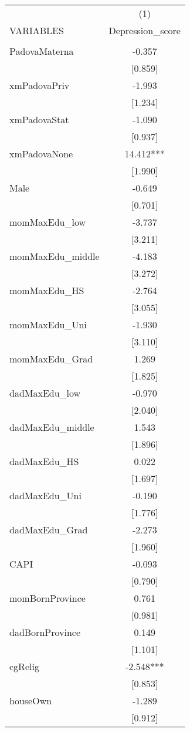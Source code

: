 \documentclass[]{article}
\begin{document}
\begin{tabular}{lc} \hline
 & (1) \\
VARIABLES & Depression\_score \\ \hline
 &  \\
PadovaMaterna & -0.357 \\
 & [0.859] \\
xmPadovaPriv & -1.993 \\
 & [1.234] \\
xmPadovaStat & -1.090 \\
 & [0.937] \\
xmPadovaNone & 14.412*** \\
 & [1.990] \\
Male & -0.649 \\
 & [0.701] \\
momMaxEdu\_low & -3.737 \\
 & [3.211] \\
momMaxEdu\_middle & -4.183 \\
 & [3.272] \\
momMaxEdu\_HS & -2.764 \\
 & [3.055] \\
momMaxEdu\_Uni & -1.930 \\
 & [3.110] \\
momMaxEdu\_Grad & 1.269 \\
 & [1.825] \\
dadMaxEdu\_low & -0.970 \\
 & [2.040] \\
dadMaxEdu\_middle & 1.543 \\
 & [1.896] \\
dadMaxEdu\_HS & 0.022 \\
 & [1.697] \\
dadMaxEdu\_Uni & -0.190 \\
 & [1.776] \\
dadMaxEdu\_Grad & -2.273 \\
 & [1.960] \\
CAPI & -0.093 \\
 & [0.790] \\
momBornProvince & 0.761 \\
 & [0.981] \\
dadBornProvince & 0.149 \\
 & [1.101] \\
cgRelig & -2.548*** \\
 & [0.853] \\
houseOwn & -1.289 \\
 & [0.912] \\

\end{tabular}
\end{document}
